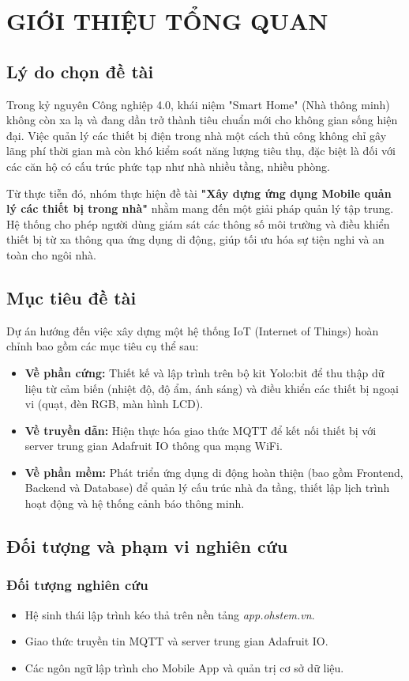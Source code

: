 \section{GIỚI THIỆU TỔNG QUAN}

\subsection{Lý do chọn đề tài}
Trong kỷ nguyên Công nghiệp 4.0, khái niệm "Smart Home" (Nhà thông minh) không còn xa lạ và đang dần trở thành tiêu chuẩn mới cho không gian sống hiện đại. Việc quản lý các thiết bị điện trong nhà một cách thủ công không chỉ gây lãng phí thời gian mà còn khó kiểm soát năng lượng tiêu thụ, đặc biệt là đối với các căn hộ có cấu trúc phức tạp như nhà nhiều tầng, nhiều phòng.

Từ thực tiễn đó, nhóm thực hiện đề tài \textbf{"Xây dựng ứng dụng Mobile quản lý các thiết bị trong nhà"} nhằm mang đến một giải pháp quản lý tập trung. Hệ thống cho phép người dùng giám sát các thông số môi trường và điều khiển thiết bị từ xa thông qua ứng dụng di động, giúp tối ưu hóa sự tiện nghi và an toàn cho ngôi nhà.

\subsection{Mục tiêu đề tài}
Dự án hướng đến việc xây dựng một hệ thống IoT (Internet of Things) hoàn chỉnh bao gồm các mục tiêu cụ thể sau:
\begin{itemize}
    \item \textbf{Về phần cứng:} Thiết kế và lập trình trên bộ kit Yolo:bit để thu thập dữ liệu từ cảm biến (nhiệt độ, độ ẩm, ánh sáng) và điều khiển các thiết bị ngoại vi (quạt, đèn RGB, màn hình LCD).
    \item \textbf{Về truyền dẫn:} Hiện thực hóa giao thức MQTT để kết nối thiết bị với server trung gian Adafruit IO thông qua mạng WiFi.
    \item \textbf{Về phần mềm:} Phát triển ứng dụng di động hoàn thiện (bao gồm Frontend, Backend và Database) để quản lý cấu trúc nhà đa tầng, thiết lập lịch trình hoạt động và hệ thống cảnh báo thông minh.
\end{itemize}

\subsection{Đối tượng và phạm vi nghiên cứu}
\subsubsection{Đối tượng nghiên cứu}
\begin{itemize}
    \item Hệ sinh thái lập trình kéo thả trên nền tảng \textit{app.ohstem.vn}.
    \item Giao thức truyền tin MQTT và server trung gian Adafruit IO.
    \item Các ngôn ngữ lập trình cho Mobile App và quản trị cơ sở dữ liệu.
\end{itemize}

